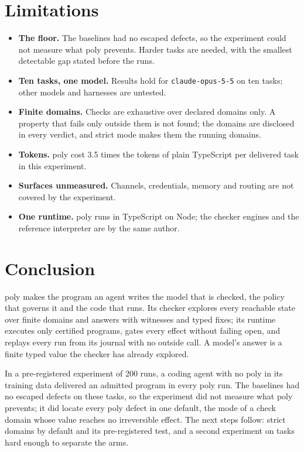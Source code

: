 \documentclass[11pt]{article}
\newcommand{\poly}{\textsf{poly}}
\begin{document}
\section{Limitations}
\label{sec:limits}

\begin{itemize}
\item \textbf{The floor.} The baselines had no escaped defects, so the experiment could not measure what \poly{} prevents. Harder tasks are needed, with the smallest detectable gap stated before the runs.
\item \textbf{Ten tasks, one model.} Results hold for \texttt{claude-opus-5-5} on ten tasks; other models and harnesses are untested.
\item \textbf{Finite domains.} Checks are exhaustive over declared domains only. A property that fails only outside them is not found; the domains are disclosed in every verdict, and strict mode makes them the running domains.
\item \textbf{Tokens.} \poly{} cost 3.5 times the tokens of plain TypeScript per delivered task in this experiment.
\item \textbf{Surfaces unmeasured.} Channels, credentials, memory and routing are not covered by the experiment.
\item \textbf{One runtime.} \poly{} runs in TypeScript on Node; the checker engines and the reference interpreter are by the same author.
\end{itemize}

\section{Conclusion}
\label{sec:conclusion}

\poly{} makes the program an agent writes the model that is checked, the policy that governs it and the code that runs. Its checker explores every reachable state over finite domains and answers with witnesses and typed fixes; its runtime executes only certified programs, gates every effect without failing open, and replays every run from its journal with no outside call. A model's answer is a finite typed value the checker has already explored.

In a pre-registered experiment of 200 runs, a coding agent with no \poly{} in its training data delivered an admitted program in every \poly{} run. The baselines had no escaped defects on these tasks, so the experiment did not measure what \poly{} prevents; it did locate every \poly{} defect in one default, the mode of a check domain whose value reaches no irreversible effect. The next steps follow: strict domains by default and its pre-registered test, and a second experiment on tasks hard enough to separate the arms.
\end{document}
